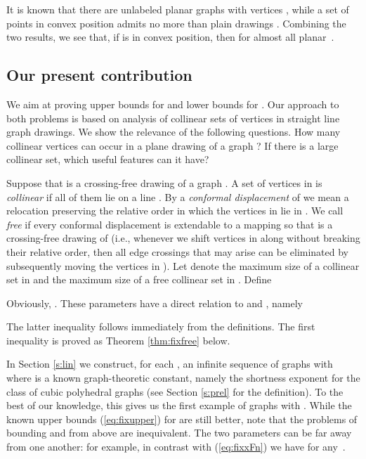 \documentclass[reqno,12pt]{amsart}
\newcommand{\refeq}[1]{(\ref{eq:#1})}
\begin{document}
It is known that there are 
unlabeled planar graphs with  vertices \cite{GimenezN09}, while a set of  points in convex position
admits no more than  plain drawings \cite{FlajoletN99}. Combining the two results, we see
that, if  is in convex position, then  for almost all planar~.



\subsection{Our present contribution}


We aim at proving upper bounds for  and lower bounds for .
Our approach to both problems is based on analysis of collinear sets of vertices
in straight line graph drawings. We show the relevance of the following questions.
How many collinear vertices can occur in a plane drawing of a graph ?
If there is a large collinear set, which useful features can it have?

Suppose that  is a crossing-free drawing of a graph .
A set of vertices  in  is \emph{collinear} if all of them
lie on a line . By a \emph{conformal displacement} of 
we mean a relocation  preserving the relative order in which
the vertices in  lie in . We call  \emph{free} if every
conformal displacement  is extendable to a mapping
 so that  is a crossing-free
drawing of  (i.e., whenever we shift vertices in  along  without breaking
their relative order, then all edge crossings that may arise can be eliminated by subsequently
moving the vertices in ).
Let  denote the maximum size of a collinear set in  and
 the maximum size of a free collinear set in .
Define

Obviously, . These parameters have a direct relation to  and , namely

The latter inequality follows immediately from the definitions. The first
inequality is proved as Theorem \ref{thm:fixfree} below.

In Section \ref{s:lin} we construct,
for each , an infinite sequence of graphs with 
where  is a known graph-theoretic constant, namely the shortness
exponent for the class of cubic polyhedral graphs (see Section \ref{s:prel} for the definition). 
To the best of our knowledge, this gives us the first example of graphs with
. While the known upper bounds \refeq{fixupper} for  are still better,
note that the problems of bounding  and  from above are inequivalent.
The two parameters can be far away from one another: 
for example, in contrast with \refeq{fixxFn} we have  for any~.
\end{document}
